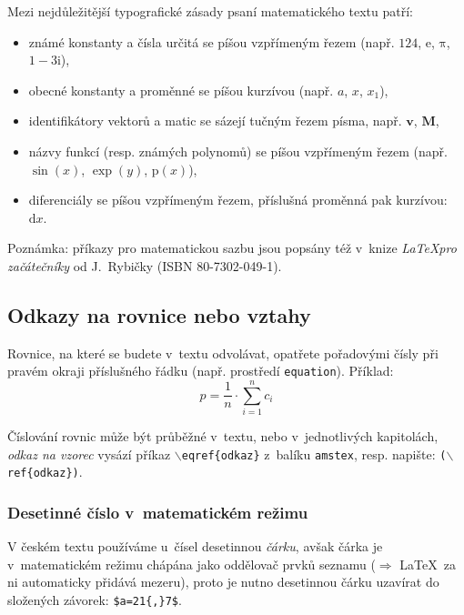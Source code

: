 Mezi nejdůležitější typografické zásady psaní matematického textu patří:
\begin{itemize}\itemsep=2pt
\item známé konstanty a čísla určitá se píšou vzpřímeným řezem (např. $124$, $\mathrm e$, $\mathrm{\pi}$, $1-3\mathrm i$),
\item obecné konstanty a proměnné se píšou kurzívou (např. $a$, $x$, $x_1$),
\item identifikátory vektorů a matic se sázejí tučným řezem písma, např. $\mathbf{v}$, $\mathbf{M}$,
\item názvy funkcí (resp. známých polynomů) se píšou vzpřímeným řezem (např. $\sin(x)$, $\exp(y)$, $\mathrm{p}(x)$),
\item diferenciály se píšou vzpřímeným řezem, příslušná proměnná pak kurzívou: $\mathrm{d}x$.
\end{itemize}

Poznámka: příkazy pro matematickou sazbu jsou popsány též v~knize {\em \LaTeX pro začátečníky} od J.~Rybičky (ISBN 80-7302-049-1).


\subsection{Odkazy na rovnice nebo vztahy}
Rovnice, na které se budete v~textu odvolávat, opatřete pořadovými čísly při pravém okraji příslušného řádku (např. prostředí {\tt equation}). Příklad:
\begin{equation}\label{vzorec1}
p = \frac{1}{n}\cdot\sum_{i=1}^n c_i
\end{equation}

Číslování rovnic může být průběžné v~textu, nebo v~jednotlivých kapitolách, {\em odkaz na vzorec\/} vysází příkaz {\tt $\backslash$eqref\{odkaz\}} z~balíku {\tt amstex}, resp. napište: {\tt ($\backslash$ref\{odkaz\})}.


\subsubsection{Desetinné číslo v~matematickém režimu} \label{des_cislo}
V českém textu používáme u~čísel desetinnou {\em čárku}, avšak čárka je v~mate\-ma\-tickém režimu
chápána jako oddělovač prvků seznamu ($\Rightarrow$ \LaTeX\ za ni automaticky přidává mezeru), proto je nutno desetinnou čárku uzavírat do složených závorek: {\tt \$a=21\{,\}7\$}.

